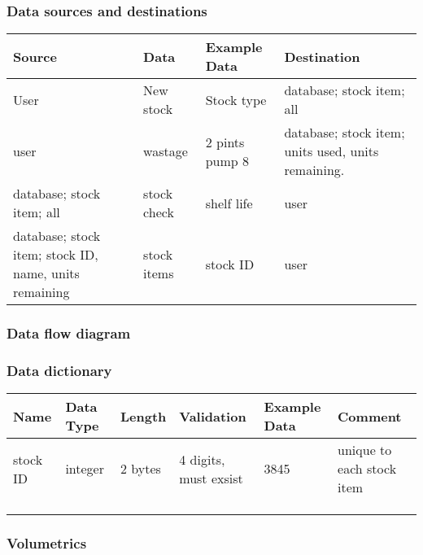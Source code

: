 \subsubsection{Data sources and destinations}
\begin{center}
\begin{tabular}{|l|l|l|l|}
    \hline
    \textbf{Source} & \textbf{Data} & \textbf{Example Data} & \textbf{Destination} \\ \hline
	User & New stock & Stock type & database; stock item; all \\ \hline
	user & wastage & 2 pints pump 8 &database; stock item; units used, units remaining. \\ \hline
	database; stock item; all & stock check & shelf life & user \\ \hline
	database; stock item; stock ID, name, units remaining & stock items & stock ID & user \\ \hline
	
	
    
\end{tabular}
\label{tab:range_examples}
\end{center}

\subsubsection{Data flow diagram}

\subsubsection{Data dictionary}
\begin{center}
\begin{tabular}{|l|l|l|l|l|l|}
    \hline
    \textbf{Name} & \textbf{Data Type} & \textbf{Length} & \textbf{Validation} & \textbf{Example Data} & \textbf{Comment} \\ \hline
	stock ID & integer & 2 bytes & 4 digits, must exsist & 3845 & unique to each stock item\\ \hline
	 \\ \hline
	\\ \hline
	 \\ \hline
	
	
    
\end{tabular}
\label{tab:range_examples}
\end{center}
\subsubsection{Volumetrics}

